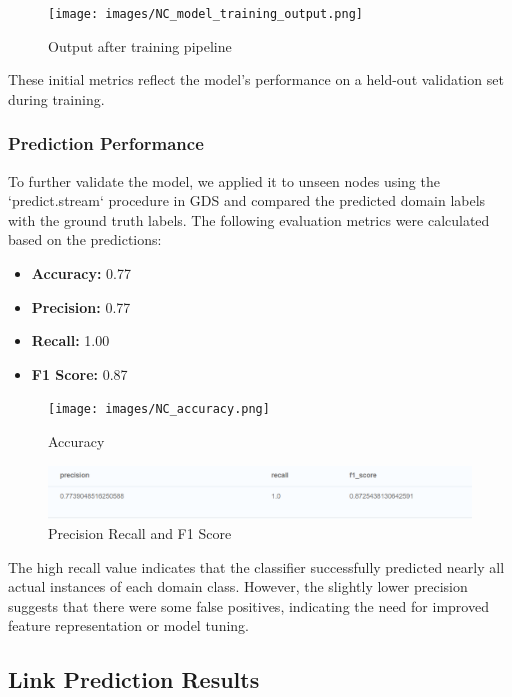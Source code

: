 \documentclass[conference, 12pt]{IEEEtran}
\begin{document}
\begin{figure}[h]
    \centering
    \texttt{[image: images/NC\_model\_training\_output.png]} 
    \caption{Output after training pipeline}
    \label{fig:classification_metrics}
\end{figure}

These initial metrics reflect the model’s performance on a held-out validation set during training.

\subsubsection{Prediction Performance}
To further validate the model, we applied it to unseen nodes using the `predict.stream` procedure in GDS and compared the predicted domain labels with the ground truth labels. The following evaluation metrics were calculated based on the predictions:

\begin{itemize}
  \item \textbf{Accuracy:} 0.77
  \item \textbf{Precision:} 0.77
  \item \textbf{Recall:} 1.00
  \item \textbf{F1 Score:} 0.87
\end{itemize}

\begin{figure}[h]
    \centering
    \texttt{[image: images/NC\_accuracy.png]} %
    \caption{Accuracy}
    \label{fig:accuracy}
\end{figure}

\begin{figure}[h]
    \centering
    \includegraphics[width=\linewidth]{images/NC_precision_recall_f1score.png} %
    \caption{Precision Recall and F1 Score}
    \label{fig:NC_Precision_Recall}
\end{figure}

The high recall value indicates that the classifier successfully predicted nearly all actual instances of each domain class. However, the slightly lower precision suggests that there were some false positives, indicating the need for improved feature representation or model tuning.


\subsection{Link Prediction Results}
\end{document}
